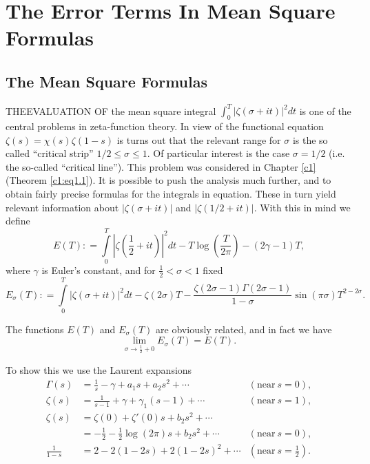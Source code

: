 \chapter{The Error Terms In Mean Square Formulas}\label{c2}

\section{The Mean Square Formulas}\label{c2:sec2.1}

THE\pageoriginale EVALUATION OF the mean square integral
$\displaystyle{\int^T_0 |\zeta (\sigma + it)|^2 dt}$ is one of the
central problems in zeta-function theory. In view of the functional
equation $\zeta(s)=\chi (s) \zeta(1-s)$ is turns out that the relevant
range for $\sigma$ is the so called ``critical strip'' $1/2 \leq
\sigma \leq 1$. Of particular interest is the case $\sigma = 1/2$
(i.e. the so-called ``critical line''). This problem was considered in
Chapter \ref{c1} (Theorem \ref{c1:eq1.1}). It is possible to push the
analysis much further, and to obtain fairly precise formulas for the
integrals in equation. These in turn yield relevant information about
$|\zeta (\sigma + it)|$ and $|\zeta (1/2 + it)|$. With this in mind we
define
\begin{equation}
  E(T) : = \int\limits_{0}^T \left|\zeta \left(\frac{1}{2} +
  it\right)\right|^2 dt - T \log 
  \left(\frac{T}{2 \pi} \right) - (2 \gamma - 1)T,\label{c2:eq2.1}
\end{equation}
where $\gamma$ is Euler's constant, and for $\frac{1}{2} < \sigma < 1$
fixed
\begin{equation}
  E_\sigma (T) : = \int\limits_0^T |\zeta (\sigma + it)|^2 dt- \zeta
  (2 \sigma) T - \frac{\zeta (2 \sigma -1)\Gamma (2 \sigma-1)}{1-
    \sigma} \sin (\pi \sigma) T^{2- 2 \sigma}.\label{c2:eq2.2} 
\end{equation}

The functions $E(T)$ and $E_\sigma (T)$ are obviously related, and in
fact we have
\begin{equation}
  \lim\limits_{\sigma \to \frac{1}{2} +0} E_\sigma (T) = E(T). \label{c2:eq2.3}
\end{equation}

To show this we use the Laurent expansions
\begin{align*}
\Gamma (s) & = \frac{1}{s} - \gamma + a_1 s + a_2 s^2 + \cdots &
(\text{near}~ s=0),\\
\zeta (s) & = \frac{1}{s-1} + \gamma + \gamma_1 (s-1)+ \cdots &
(\text{near}~ s=1),\\
\zeta(s) & = \zeta(0) + \zeta' (0) s + b_2 s^2 + \cdots\\
& = - \frac{1}{2} - \frac{1}{2} \log (2 \pi) s + b_2 s^2 + \cdots &
(\text{near}~ s=0),\\
\frac{1}{1-s} & = 2- 2(1- 2s) + 2(1- 2s)^2+ \cdots & (\text{near}~ s=
\frac{1}{2}). 
\end{align*}

